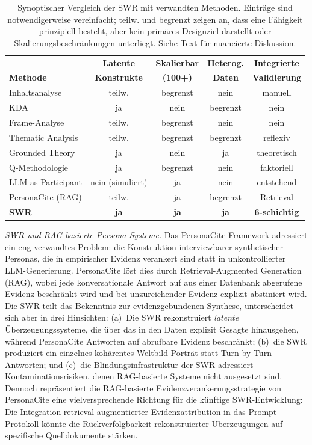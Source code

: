 \documentclass[11pt,a4paper]{article}
\theoremstyle{definition}
\theoremstyle{plain}
\theoremstyle{remark}
\begin{document}
\begin{table}[ht]
\centering
\small
\caption{Synoptischer Vergleich der SWR mit verwandten Methoden. Eintr\"age sind notwendigerweise vereinfacht; \glqq teilw.\grqq{} und \glqq begrenzt\grqq{} zeigen an, dass eine F\"ahigkeit prinzipiell besteht, aber kein prim\"ares Designziel darstellt oder Skalierungsbeschr\"ankungen unterliegt. Siehe Text f\"ur nuancierte Diskussion.}
\label{tab:methodenvergleich}
\begin{tabular}{lcccc}
\toprule
 & \textbf{Latente} & \textbf{Skalierbar} & \textbf{Heterog.} & \textbf{Integrierte} \\
\textbf{Methode} & \textbf{Konstrukte} & \textbf{(100+)} & \textbf{Daten} & \textbf{Validierung} \\
\midrule
Inhaltsanalyse & teilw. & begrenzt & nein & manuell \\
KDA & ja & nein & begrenzt & nein \\
Frame-Analyse & teilw. & begrenzt & nein & nein \\
Thematic Analysis & teilw. & begrenzt & begrenzt & reflexiv \\
Grounded Theory & ja & nein & ja & theoretisch \\
Q-Methodologie & ja & begrenzt & nein & faktoriell \\
LLM-as-Participant & nein (simuliert) & ja & nein & entstehend \\
PersonaCite (RAG) & teilw. & ja & begrenzt & Retrieval \\
\textbf{SWR} & \textbf{ja} & \textbf{ja} & \textbf{ja} & \textbf{6-schichtig} \\
\bottomrule
\end{tabular}
\end{table}

\emph{SWR und RAG-basierte Persona-Systeme.} Das PersonaCite-Framework \citep{PersonaCite2026} adressiert ein eng verwandtes Problem: die Konstruktion interviewbarer synthetischer Personas, die in empirischer Evidenz verankert sind statt in unkontrollierter LLM-Generierung. PersonaCite l\"ost dies durch Retrieval-Augmented Generation (RAG), wobei jede konversationale Antwort auf aus einer Datenbank abgerufene Evidenz beschr\"ankt wird und bei unzureichender Evidenz explizit abstiniert wird. Die SWR teilt das Bekenntnis zur evidenzgebundenen Synthese, unterscheidet sich aber in drei Hinsichten: (a)~Die SWR rekonstruiert \emph{latente} \"Uberzeugungssysteme, die \"uber das in den Daten explizit Gesagte hinausgehen, w\"ahrend PersonaCite Antworten auf abrufbare Evidenz beschr\"ankt; (b)~die SWR produziert ein einzelnes koh\"arentes Weltbild-Portr\"at statt Turn-by-Turn-Antworten; und (c)~die Blindungsinfrastruktur der SWR adressiert Kontaminationsrisiken, denen RAG-basierte Systeme nicht ausgesetzt sind. Dennoch repr\"asentiert die RAG-basierte Evidenzverankerungsstrategie von PersonaCite eine vielversprechende Richtung f\"ur die k\"unftige SWR-Entwicklung: Die Integration retrieval-augmentierter Evidenzattribution in das Prompt-Protokoll k\"onnte die R\"uckverfolgbarkeit rekonstruierter \"Uberzeugungen auf spezifische Quelldokumente st\"arken.
\end{document}

